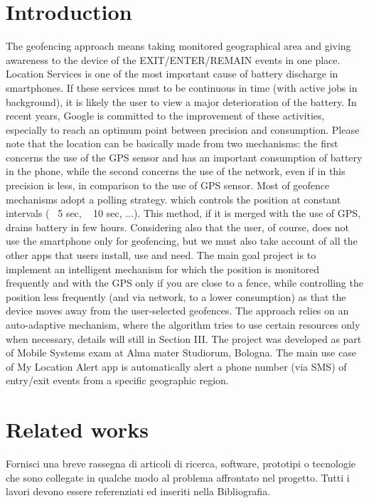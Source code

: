 \documentclass[conference]{IEEEtran}
\begin{document}
\section{Introduction}
The geofencing approach means taking monitored geographical area and giving awareness to the device of the EXIT/ENTER/REMAIN events in one place.
Location Services is one of the most important cause of battery discharge in smartphones.
If these services must to be continuous in time (with active jobs in background), it is likely the user to view a major deterioration of the battery.
In recent years, Google is committed to the improvement of these activities, especially to reach an optimum point between precision and consumption.
Please note that the location can be basically made from two mechanisms:
the first concerns the use of the GPS sensor and has an important consumption of battery in the phone, while the second concerns the use of the network, even if in this precision is less, in comparison to the use of GPS sensor.
Most of geofence mechanisms adopt a polling strategy. which controls the position at constant intervals (~ 5 sec, ~ 10 sec, ...). This method, if it is merged with the use of GPS, drains battery in few hours. Considering also that the user, of course, does not use the smartphone only for geofencing, but we must also take account of all the other apps that users install, use and need.
The main goal project is to implement an intelligent mechanism for which the position is monitored frequently and with the GPS only if you are close to a fence, while controlling the position less frequently (and via network, to a lower consumption) as that the device moves away from the user-selected geofences.
The approach relies on an auto-adaptive mechanism, where the algorithm tries to use certain resources only when necessary, details will still in Section III.
The project was developed as part of Mobile Systems exam at Alma mater Studiorum, Bologna.
The main use case of My Location Alert app is automatically alert a phone number (via SMS) of entry/exit events from a specific geographic region. 

\section{Related works}
Fornisci una breve rassegna di articoli di ricerca, software, prototipi o tecnologie che sono collegate in qualche modo al problema affrontato nel progetto. Tutti i lavori devono essere referenziati ed inseriti nella Bibliografia.
\end{document}
